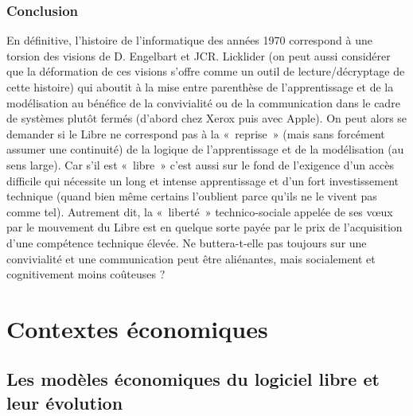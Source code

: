 \documentclass{FramateX}
\begin{document}
\begin{refsection}
\section*{Conclusion}
{}

En définitive, l'histoire de l'informatique des années 1970 correspond à
une torsion des visions de D. Engelbart et JCR. Licklider (on
peut aussi considérer que la déformation de ces visions s'offre comme
un outil de lecture/décryptage de cette histoire) qui aboutit à la mise
entre parenthèse de l'apprentissage et de la modélisation au bénéfice
de la convivialité ou de la communication dans le cadre de systèmes
plutôt fermés (d'abord chez Xerox puis avec Apple). On peut alors se
demander si le Libre ne correspond pas à la «~reprise~» (mais sans
forcément assumer une continuité) de la logique de l'apprentissage et
de la modélisation (au sens large). Car s'il est «~libre~» c'est aussi
sur le fond de l'exigence d'un accès difficile qui nécessite un long et
intense apprentissage et d'un fort investissement technique (quand bien
même certains l'oublient parce qu'ils ne le vivent pas comme tel).
Autrement dit, la «~liberté~» technico-sociale appelée de ses vœux par
le mouvement du Libre est en quelque sorte payée par le prix de l'acquisition
d'une compétence technique élevée. Ne buttera-t-elle pas toujours sur
une convivialité et une communication peut être aliénantes, mais
socialement et cognitivement moins coûteuses ? 

\nocite{engelbartaugmenting1962,engelbartresearch2003,foucaultarcheologie1969,lickliderman-computer1960,licklidermemorandum1963,robertmnemotechnologies2010}





\printbibliography[heading=subbibliography]
\end{refsection}

%
\part{Contextes économiques}
%
\chapter*{Les modèles économiques du logiciel libre et leur évolution} 
{}
\end{document}
